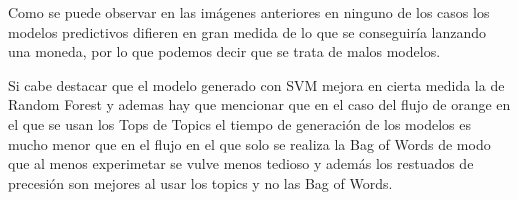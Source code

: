 \documentclass[runningheads]{llncs}
\begin{document}
Como se puede observar en las imágenes anteriores en ninguno de los casos los modelos predictivos difieren en gran medida 
de lo que se conseguiría lanzando una moneda, por lo que podemos decir que se trata de malos modelos.

Si cabe destacar que el modelo generado con SVM mejora en cierta medida la de Random Forest y ademas hay que mencionar que 
en el caso del flujo de orange en el que se usan los Tops de Topics el tiempo de generación de los modelos es mucho menor 
que en el flujo en el que solo se realiza la Bag of Words de modo que al menos experimetar se vulve menos tedioso y además 
los restuados de precesión son mejores al usar los topics y no las Bag of Words.
\end{document}

